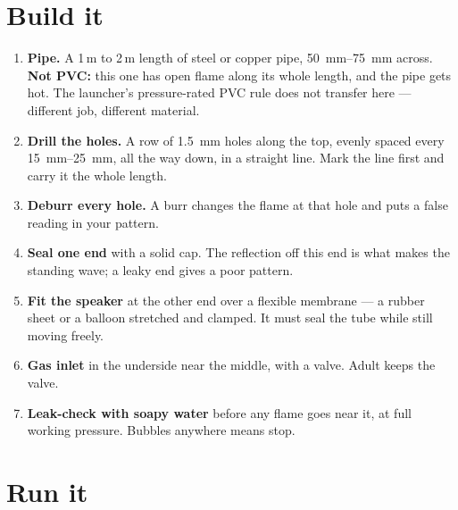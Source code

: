 \section{Build it}
\begin{enumerate}
\item \textbf{Pipe.} A 1\,m to 2\,m length of steel or copper pipe, \qtyrange{50}{75}{mm} across. \textbf{Not PVC:} this one has open flame along its whole length, and the pipe gets hot. The launcher's pressure-rated PVC rule does not transfer here --- different job, different material.
\item \textbf{Drill the holes.} A row of \qty{1.5}{mm} holes along the top, evenly spaced every \qtyrange{15}{25}{mm}, all the way down, in a straight line. Mark the line first and carry it the whole length. 
\item \textbf{Deburr every hole.} A burr changes the flame at that hole and puts a false reading in your pattern. 
\item \textbf{Seal one end} with a solid cap. The reflection off this end is what makes the standing wave; a leaky end gives a poor pattern.
\item \textbf{Fit the speaker} at the other end over a flexible membrane --- a rubber sheet or a balloon stretched and clamped. It must seal the tube while still moving freely.
\item \textbf{Gas inlet} in the underside near the middle, with a valve. Adult keeps the valve.
\item \textbf{Leak-check with soapy water} before any flame goes near it, at full working pressure. Bubbles anywhere means stop.
\end{enumerate}

\section{Run it}
\begin{telosfacts}[0.20]
\end{telosfacts}

